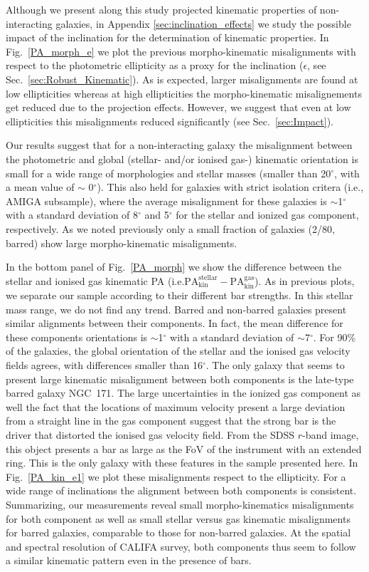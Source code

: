 \documentclass[longauth,traditabstract]{aa}
\begin{document}
Although we present along this study projected kinematic properties of non-interacting galaxies, in Appendix \ref{sec:inclination_effects} we study the possible impact of the inclination for the determination of kinematic properties. In Fig.~\ref{PA_morph_e} we plot the previous morpho-kinematic misalignments with respect to the photometric ellipticity as a proxy for the inclination ($\epsilon$, see Sec.~\ref{sec:Robust_Kinematic}). As is expected, larger misalignments are found at low ellipticities whereas at high ellipticities the morpho-kinematic misalignements get reduced due to the projection effects. However, we suggest that even at low ellipticities this misalignments reduced significantly (see Sec.~\ref{sec:Impact}).

Our results suggest that for a non-interacting galaxy the misalignment between the photometric and global (stellar- and/or ionised gas-) kinematic orientation is small for a wide range of morphologies and stellar masses (smaller than 20$^\circ$, with a mean value of  $\sim$ 0$^\circ$). This also held for galaxies with  strict isolation critera (i.e., AMIGA subsample), where the average misalignment for these galaxies is $\sim$1$^\circ$ with a standard deviation of 8$^\circ$ and 5$^\circ$ for the stellar and ionized gas component, respectively. As we noted previously only a small fraction of galaxies (2/80, barred) show large morpho-kinematic misalignments.


In the bottom panel of Fig.~\ref{PA_morph} we show the difference
between the stellar and ionised gas kinematic PA (i.e.$\mathrm{PA_{kin}^{stellar}}-\mathrm{PA_{kin}^{gas}}$). As in previous plots, we separate our sample according to their different bar strengths. In this stellar mass range, we do not find any trend. Barred and non-barred galaxies present similar alignments between their components. In fact, the mean difference for these components orientations is $\sim$1$^\circ$ with a standard deviation of $\sim$7$^\circ$. For 90\% of the galaxies, the global orientation of the stellar and the ionised gas velocity fields agrees, with differences smaller than 16$^\circ$. The only galaxy that seems to present large kinematic misalignment between both components is the late-type barred galaxy NGC~171. The large uncertainties in  the ionized gas component as well the fact that the locations of maximum velocity  present a large deviation from a straight line in the gas component suggest that the strong bar is the driver that distorted the ionised gas velocity field. From the SDSS $r$-band image, this object presents a bar as large as the FoV of the instrument with an extended ring. This is the only galaxy with these features in the sample presented here. In Fig.~\ref{PA_kin_e1} we plot these misalignments respect to the ellipticity. For a wide range of inclinations the alignment between both components is consistent. Summarizing, our measurements reveal small morpho-kinematics misalignments for both component as well as small stellar versus gas kinematic misalignments for barred galaxies, comparable to those for non-barred galaxies. At the spatial and spectral resolution of CALIFA survey, both components thus seem to follow a similar kinematic pattern even in the presence of bars.
\end{document}
